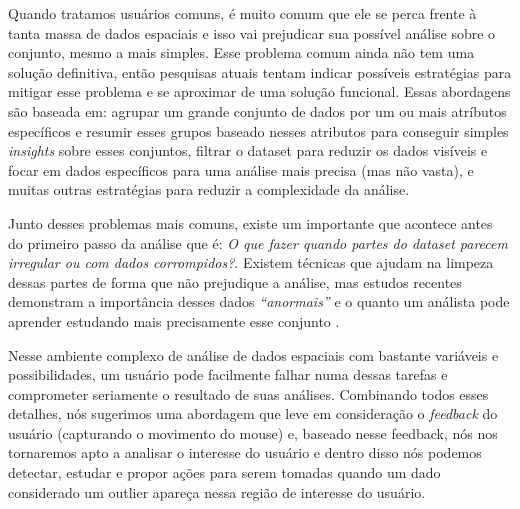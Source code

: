 Quando tratamos usuários comuns, é muito comum que ele se perca frente à tanta massa de dados espaciais e isso vai prejudicar sua possível análise sobre o conjunto, mesmo a mais simples. Esse problema comum ainda não tem uma solução definitiva, então pesquisas atuais tentam indicar possíveis estratégias para mitigar esse problema e se aproximar de uma solução funcional. Essas abordagens são baseada em: agrupar um grande conjunto de dados por um ou mais atríbutos específicos e resumir esses grupos baseado nesses atributos para conseguir simples \textit{insights} sobre esses conjuntos, filtrar o dataset para reduzir os dados visíveis e focar em dados específicos para uma análise mais precisa (mas não vasta), e muitas outras estratégias para reduzir a complexidade da análise.


Junto desses problemas mais comuns, existe um importante que acontece antes do primeiro passo da análise que é: \textit{O que fazer quando partes do dataset parecem irregular ou com dados corrompidos?}. Existem técnicas que ajudam na limpeza dessas partes de forma que não prejudique a análise, mas estudos recentes demonstram a importância desses dados \textit{``anormais''} e o quanto um análista pode aprender estudando mais precisamente esse conjunto \cite{DBLP:journals/debu/FreireCVZ16}.


Nesse ambiente complexo de análise de dados espaciais com bastante variáveis e possibilidades, um usuário pode facilmente falhar numa dessas tarefas e comprometer seriamente o resultado de suas análises. Combinando todos esses detalhes, nós sugerimos uma abordagem que leve em consideração o \textit{feedback} do usuário (capturando o movimento do mouse) e, baseado nesse feedback, nós nos tornaremos apto a analisar o interesse do usuário e dentro disso nós podemos detectar, estudar e propor ações para serem tomadas quando um dado considerado um outlier apareça nessa região de interesse do usuário.

